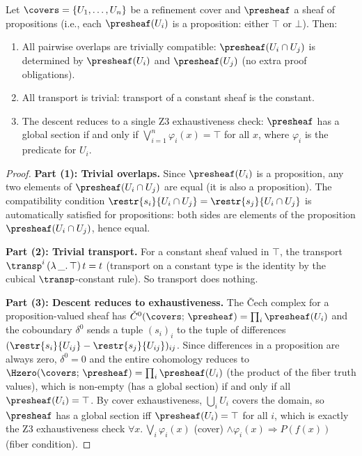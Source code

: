 \begin{theorem}
\label{thm:truncation-collapse}
Let $\covers = \{U_1, \ldots, U_n\}$ be a refinement cover and
$\presheaf$ a sheaf of propositions (i.e., each $\presheaf(U_i)$ is a
proposition: either $\top$ or $\bot$).  Then:
\begin{enumerate}
\item All pairwise overlaps are trivially compatible:
  $\presheaf(U_i \cap U_j)$ is determined by $\presheaf(U_i)$ and
  $\presheaf(U_j)$ (no extra proof obligations).
\item All transport is trivial: transport of a constant sheaf is the
  constant.
\item The descent reduces to a single Z3 exhaustiveness check:
  $\presheaf$ has a global section if and only if
  $\bigvee_{i=1}^n \varphi_i(x) = \top$ for all $x$,
  where $\varphi_i$ is the predicate for $U_i$.
\end{enumerate}
\end{theorem}

\begin{proof}
\textbf{Part (1): Trivial overlaps.}
Since $\presheaf(U_i)$ is a proposition, any two elements of
$\presheaf(U_i \cap U_j)$ are equal (it is also a proposition).
The compatibility condition
$\restr{s_i}{U_i \cap U_j} = \restr{s_j}{U_i \cap U_j}$
is automatically satisfied for propositions: both sides are elements
of the proposition $\presheaf(U_i \cap U_j)$, hence equal.

\textbf{Part (2): Trivial transport.}
For a constant sheaf valued in $\top$, the transport
$\transp^i\,(\lambda\,\_.\,\top)\,t = t$
(transport on a constant type is the identity by the cubical
$\transp$-constant rule).  So transport does nothing.

\textbf{Part (3): Descent reduces to exhaustiveness.}
The \v{C}ech complex for a proposition-valued sheaf has
$\check{C}^0(\covers;\,\presheaf) = \prod_i \presheaf(U_i)$
and the coboundary $\delta^0$ sends a tuple $(s_i)_i$ to the
tuple of differences $(\restr{s_i}{U_{ij}} - \restr{s_j}{U_{ij}})_{ij}$.
Since differences in a proposition are always zero, $\delta^0 = 0$
and the entire cohomology reduces to
$\Hzero(\covers;\,\presheaf) = \prod_i \presheaf(U_i)$
(the product of the fiber truth values), which is non-empty (has a
global section) if and only if all $\presheaf(U_i) = \top$.
By cover exhaustiveness, $\bigcup_i U_i$ covers the domain, so
$\presheaf$ has a global section iff $\presheaf(U_i) = \top$ for all $i$,
which is exactly the Z3 exhaustiveness check
$\forall x.\,\bigvee_i \varphi_i(x)$ (cover) $\wedge \varphi_i(x) \Rightarrow P(f(x))$
(fiber condition).
\end{proof}

